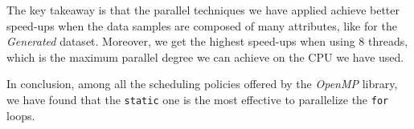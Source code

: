 \documentclass{article}
\begin{document}
The key takeaway is that the parallel techniques we have applied achieve better speed-ups when the data samples are composed of many attributes, like for the \textit{Generated} dataset.%
Moreover, we get the highest speed-ups when using 8 threads, which is the maximum parallel degree we can achieve on the CPU we have used.

In conclusion, among all the scheduling policies offered by the \textit{OpenMP} library, we have found that the \texttt{static} one is the most effective to parallelize the \texttt{for} loops.
\vspace{-6pt}



\newlength{\graphShift}
\newlength{\axesLineWidth}
\newlength{\gridLineWidth}
\newlength{\graphLineWidth}
\setlength{\graphShift}{30mm}
\setlength{\axesLineWidth}{2pt}
\setlength{\gridLineWidth}{1pt}
\setlength{\graphLineWidth}{2pt}




\end{document}
